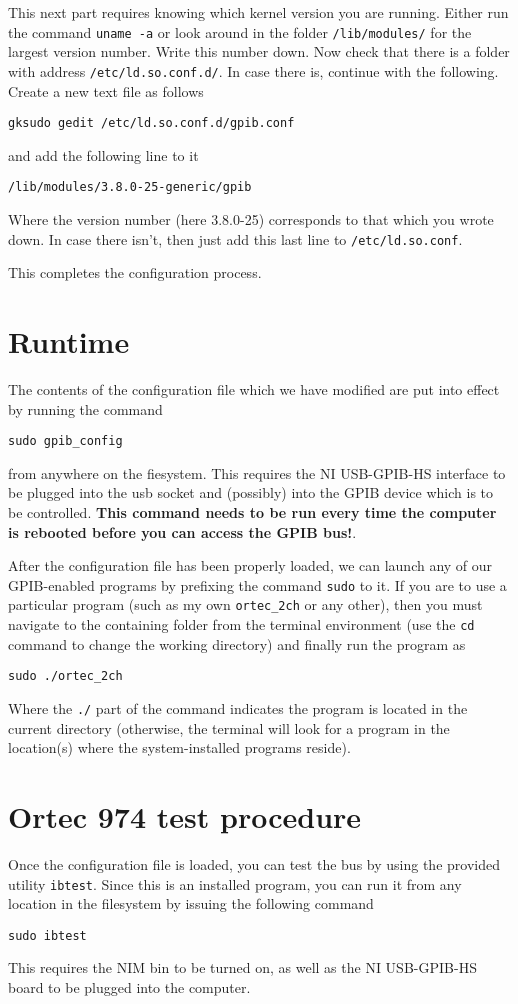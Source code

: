 \documentclass[letterpaper,11pt]{article}
\begin{document}
This next part requires knowing which kernel version you are running. Either run the command \texttt{uname -a} or look around in the folder \texttt{/lib/modules/} for the largest version number. Write this number down. Now check that there is a folder with address \texttt{/etc/ld.so.conf.d/}. In case there is, continue with the following. Create a new text file as follows
\begin{verbatim}
gksudo gedit /etc/ld.so.conf.d/gpib.conf
\end{verbatim}
and add the following line to it
\begin{verbatim}
/lib/modules/3.8.0-25-generic/gpib
\end{verbatim}
Where the version number (here 3.8.0-25) corresponds to that which you wrote down. In case there isn't, then just add this last line to \texttt{/etc/ld.so.conf}.

This completes the configuration process.

\section{Runtime}
The contents of the configuration file which we have modified are put into effect by running the command
\begin{verbatim}
sudo gpib_config
\end{verbatim}
from anywhere on the fiesystem. This requires the NI USB-GPIB-HS interface to be plugged into the usb socket and (possibly) into the GPIB device which is to be controlled. \textbf{This command needs to be run every time the computer is rebooted before you can access the GPIB bus!}.

After the configuration file has been properly loaded, we can launch any of our GPIB-enabled programs by prefixing the command \texttt{sudo} to it. If you are to use a particular program (such as my own \texttt{ortec\_2ch} or any other), then you must navigate to the containing folder from the terminal environment (use the \texttt{cd} command to change the working directory) and finally run the program as
\begin{verbatim}
sudo ./ortec_2ch
\end{verbatim}
Where the \texttt{./} part of the command indicates the program is located in the current directory (otherwise, the terminal will look for a program in the location(s) where the system-installed programs reside).

\section{Ortec 974 test procedure}
Once the configuration file is loaded, you can test the bus by using the provided utility \texttt{ibtest}. Since this is an installed program, you can run it from any location in the filesystem by issuing the following command
\begin{verbatim}
sudo ibtest
\end{verbatim}
This requires the NIM bin to be turned on, as well as the NI USB-GPIB-HS board to be plugged into the computer.
\end{document}
